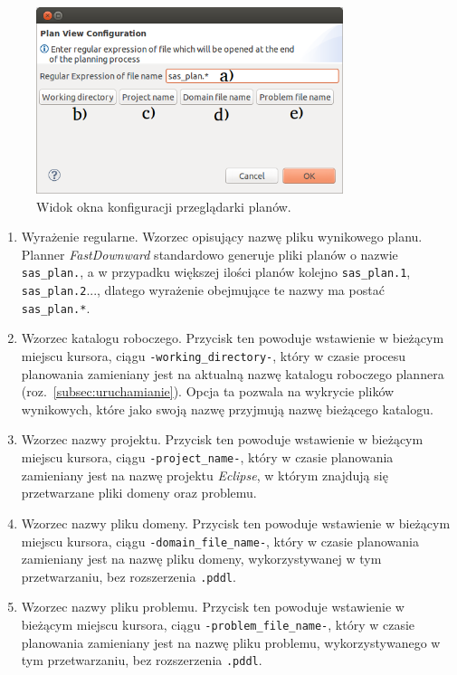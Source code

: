 \begin{enumerate}
\begin{figure}[h!]
    \centering
    \includegraphics[width=0.8\textwidth]{img/plan_view_dialog}
    \caption{Widok okna konfiguracji przeglądarki planów.}
    \label{fig:plan_view_window}
\end{figure}
\begin{enumerate}
\item Wyrażenie regularne. Wzorzec opisujący nazwę pliku wynikowego planu. Planner \textit{FastDownward} standardowo generuje pliki planów o nazwie \texttt{sas\_plan.}, a w przypadku większej ilości planów kolejno \texttt{sas\_plan.1}, \texttt{sas\_plan.2}..., dlatego wyrażenie obejmujące te nazwy ma postać \texttt{sas\_plan.*}.
\item Wzorzec katalogu roboczego. Przycisk ten powoduje wstawienie w bieżącym miejscu kursora, ciągu \texttt{-working\_directory-}, który w czasie procesu planowania zamieniany jest na aktualną nazwę katalogu roboczego plannera (roz.~\ref{subsec:uruchamianie}). Opcja ta pozwala na wykrycie plików wynikowych, które jako swoją nazwę przyjmują nazwę bieżącego katalogu.
\item Wzorzec nazwy projektu. Przycisk ten powoduje wstawienie w bieżącym miejscu kursora, ciągu \texttt{-project\_name-}, który w czasie planowania zamieniany jest na nazwę projektu \textit{Eclipse}, w którym znajdują się przetwarzane pliki domeny oraz problemu.
\item Wzorzec nazwy pliku domeny. Przycisk ten powoduje wstawienie w bieżącym miejscu kursora, ciągu \texttt{-domain\_file\_name-}, który w czasie planowania zamieniany jest na nazwę pliku domeny, wykorzystywanej w tym przetwarzaniu, bez rozszerzenia \texttt{.pddl}.
\item Wzorzec nazwy pliku problemu. Przycisk ten powoduje wstawienie w bieżącym miejscu kursora, ciągu \texttt{-problem\_file\_name-}, który w czasie planowania zamieniany jest na nazwę pliku problemu, wykorzystywanego w tym przetwarzaniu, bez rozszerzenia \texttt{.pddl}.
\end{enumerate}
\end{enumerate}

